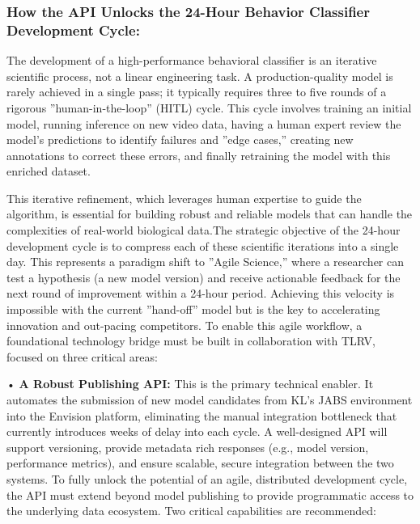 \documentclass[11pt,a4paper]{article}
\begin{document}
\subsubsection{How the API Unlocks the 24-Hour Behavior Classifier Development Cycle:}

The development of a high-performance behavioral classifier is an iterative scientific process, not a linear engineering task. A production-quality model is rarely achieved in a single pass; it typically requires three to five rounds of a rigorous ”human-in-the-loop” (HITL) cycle. This cycle involves training an initial model, running inference on new video data, having a human expert review the model’s predictions to identify failures and ”edge cases,” creating new annotations to correct these errors, and finally retraining the model with this enriched dataset.

This iterative refinement, which leverages human expertise to guide the algorithm, is essential for building robust and reliable models that can handle the complexities of real-world biological data.The strategic objective of the 24-hour development cycle is to compress each of these scientific iterations into a single day. This represents a paradigm shift to ”Agile Science,” where a researcher can test a hypothesis (a new model version) and receive actionable feedback for the next round of improvement within a 24-hour period. Achieving this velocity is impossible with the current ”hand-off” model but is the key to accelerating innovation and out-pacing competitors. To enable this agile workflow, a foundational technology bridge must be built in collaboration with TLRV, focused on three critical areas:

• \textbf{A Robust Publishing API:} This is the primary technical enabler. It automates the
submission of new model candidates from KL’s JABS environment into the Envision
platform, eliminating the manual integration bottleneck that currently introduces weeks of delay into each cycle. A well-designed API will support versioning, provide metadata rich responses (e.g., model version, performance metrics), and ensure scalable, secure integration between the two systems. To fully unlock the potential of an agile, distributed development cycle, the API must extend beyond model publishing to provide programmatic access to the underlying data ecosystem. Two critical capabilities are recommended:
\end{document}
